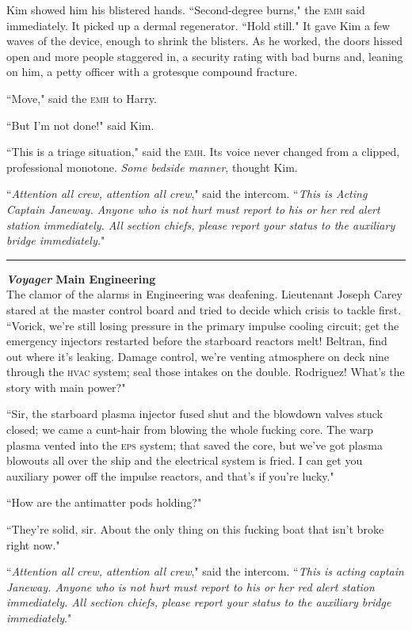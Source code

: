 \documentclass[twoside,letterpaper,12pt]{memoir}
\begin{document}
Kim showed him his blistered hands. ``Second-degree burns," the \textsc{emh} said immediately. It picked up a dermal regenerator. ``Hold still." It gave Kim a few waves of the device, enough to shrink the blisters. As he worked, the doors hissed open and more people staggered in, a security rating with bad burns and, leaning on him, a petty officer with a grotesque compound fracture.

``Move," said the \textsc{emh} to Harry.

``But I'm not done!" said Kim.

``This is a triage situation," said the \textsc{emh}. Its voice never changed from a clipped, professional monotone. \textit{Some bedside manner}, thought Kim.

``\textit{Attention all crew, attention all crew}," said the intercom. ``\textit{This is Acting Captain Janeway. Anyone who is not hurt must report to his or her red alert station immediately. All section chiefs, please report your status to the auxiliary bridge immediately.}"

\fancybreak{\rule{3cm}{0.4 pt}}
\noindent\textbf{\textit{Voyager} Main Engineering}\\

The clamor of the alarms in Engineering was deafening. Lieutenant Joseph Carey stared at the master control board and tried to decide which crisis to tackle first. ``Vorick, we're still losing pressure in the primary impulse cooling circuit; get the emergency injectors restarted before the starboard reactors melt! Beltran, find out where it's leaking. Damage control, we're venting atmosphere on deck nine through the \textsc{hvac} system; seal those intakes on the double. Rodriguez! What's the story with main power?"

``Sir, the starboard plasma injector fused shut and the blowdown valves stuck closed; we came a cunt-hair from blowing the whole fucking core. The warp plasma vented into the \textsc{eps} system; that saved the core, but we've got plasma blowouts all over the ship and the electrical system is fried. I can get you auxiliary power off the impulse reactors, and that's if you're lucky."

``How are the antimatter pods holding?"

``They're solid, sir. About the only thing on this fucking boat that isn't broke right now."

``\textit{Attention all crew, attention all crew}," said the intercom. ``\textit{This is acting captain Janeway. Anyone who is not hurt must report to his or her red alert station immediately. All section chiefs, please report your status to the auxiliary bridge immediately}."
\end{document}
